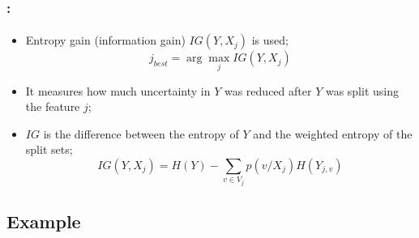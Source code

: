 \documentclass[xcolor=table]{beamer}
\begin{document}
\begin{frame}
	\frametitle{\insertshortsubtitle: \insertsection}
	\framesubtitle{\insertsubsection}
	
	\begin{itemize}
		\item Entropy gain (information gain) $IG(Y, X_j)$ is used;
		\[ j_{best} = \arg\max_{j} IG(Y, X_{j}) \]
		\item It measures how much uncertainty in $Y$ was reduced after $ Y $ was split using the feature $j$;
		\item $ IG $ is the difference between the entropy of $Y$ and the weighted entropy of the split sets;
		\[IG(Y, X_j) = H(Y) - \sum_{v \in V_j} p(v/X_j) H(Y_{j, v})\]
	\end{itemize}
	
\end{frame}

\subsection{Example}
\end{document}
